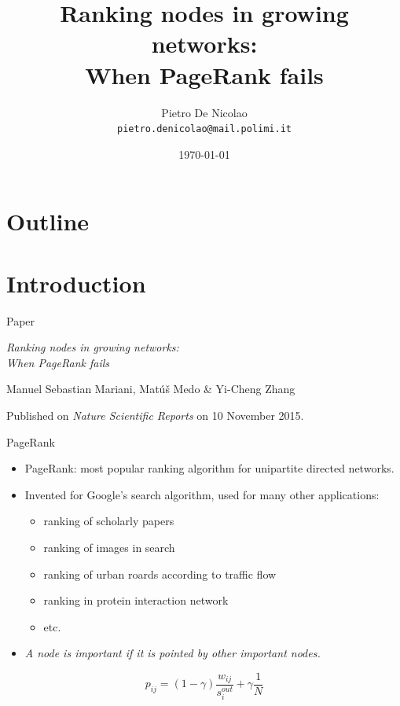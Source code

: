 \documentclass[utf8]{beamer}
\title[When PageRank fails]{Ranking nodes in growing networks: \\ When PageRank fails}
\author[De Nicolao]{Pietro De Nicolao \\ \texttt{pietro.denicolao@mail.polimi.it}}
\date{\today} %
\institute{Politecnico di Milano}
\begin{document}
\begin{frame}
 \titlepage
\end{frame}

\section*{Outline}
\begin{frame}
 \tableofcontents
\end{frame}

\section{Introduction}
\begin{frame}{Paper}
    \begin{center}
    \emph{\Large Ranking nodes in growing networks: \\ When PageRank fails}
    \end{center}

    Manuel Sebastian Mariani, Matúš Medo \& Yi-Cheng Zhang

    Published on \emph{Nature Scientific Reports} on 10 November 2015.
\end{frame}

\begin{frame}{PageRank}
    \begin{itemize}
        \item PageRank: most popular ranking algorithm for unipartite directed networks.
        \item Invented for Google's search algorithm, used for many other applications:
        \begin{itemize}
            \item ranking of scholarly papers
            \item ranking of images in search
            \item ranking of urban roards according to traffic flow
            \item ranking in protein interaction network
            \item etc.
        \end{itemize}
        \item \emph{A node is important if it is pointed by other important nodes.}
    \end{itemize}
    \[
        p_{ij} = (1-\gamma) \frac{w_{ij}}{s_i^{out}} + \gamma \frac{1}{N}
    \]
\end{frame}
\end{document}
